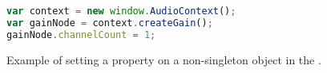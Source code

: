 \lstset{numbers=left,xleftmargin=2em,frame=single,framexleftmargin=1.5em}
\begin{figure}[h]
\begin{lstlisting}[language=javascript]
var context = new window.AudioContext();
var gainNode = context.createGain();
gainNode.channelCount = 1;
\end{lstlisting}
\caption{Example of setting a property on a non-singleton object in the \WA.}
\label{fig:non-singleton-property-js}
\end{figure}
